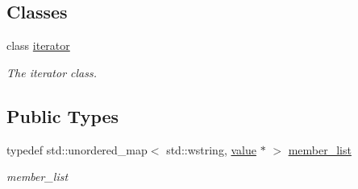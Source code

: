 \subsection*{Classes}
\begin{DoxyCompactItemize}
\item 
class \hyperlink{classformat_1_1object_1_1iterator}{iterator}
\begin{DoxyCompactList}\small\item\em The iterator class. \end{DoxyCompactList}\end{DoxyCompactItemize}
\subsection*{Public Types}
\begin{DoxyCompactItemize}
\item 
typedef std\+::unordered\+\_\+map$<$ std\+::wstring, \hyperlink{classformat_1_1value_aa6b85823936bf7b8ab78d3f8d443c00d}{value} $\ast$ $>$ \hyperlink{classformat_1_1object_a832cdbf5fe57050ca910fd2e98f53e44}{member\+\_\+list}\hypertarget{classformat_1_1object_a832cdbf5fe57050ca910fd2e98f53e44}{}\label{classformat_1_1object_a832cdbf5fe57050ca910fd2e98f53e44}

\begin{DoxyCompactList}\small\item\em member\+\_\+list \end{DoxyCompactList}\end{DoxyCompactItemize}
